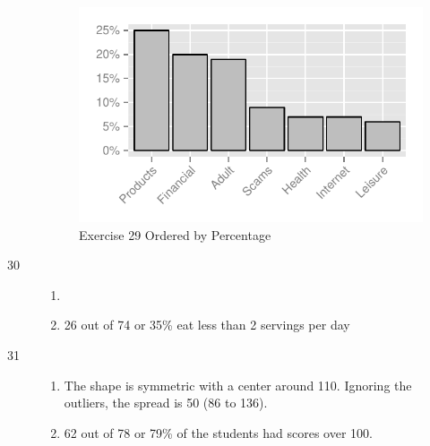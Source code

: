 \documentclass[letterpaper, landscape]{exam}
\begin{document}
\begin{description}
        \begin{figure}[H]
          \centering
          \includegraphics{figures/ex29b.pdf}
          \caption{Exercise 29 Ordered by Percentage}\label{fig:ex29b}
        \end{figure}

      \item[30]
        \begin{enumerate}[{a}]
          \item

          \item 26 out of 74 or 35\% eat less than 2 servings per day
        \end{enumerate}

      \item[31]
        \begin{enumerate}[{a}]
          \item The shape is symmetric with a center around 110.  Ignoring the
          outliers, the spread is 50 (86 to 136).

          \item 62 out of 78 or 79\% of the students had scores over 100.
        \end{enumerate}


\end{description}
\end{document}
